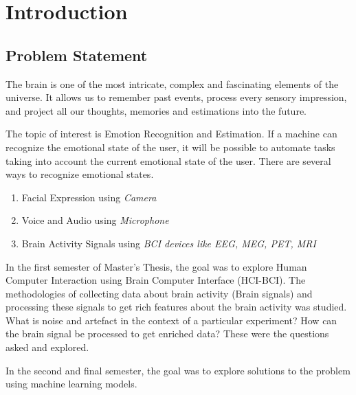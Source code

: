 
\chapter{Introduction} %

\label{Chapter 1} %



\section{Problem Statement}
The brain is one of the most intricate, complex and fascinating elements of the universe. It allows us to remember past events, process every sensory impression, and project all our thoughts, memories and estimations into the future.

The topic of interest is Emotion Recognition and Estimation. If a machine can recognize the emotional state of the user, it will be possible to automate tasks taking into account the current emotional state of the user. There are several ways to recognize emotional states.
\begin{enumerate}
\item Facial Expression using \emph{Camera}
\item Voice and Audio using \emph{Microphone}
\item Brain Activity Signals using \emph{BCI devices like EEG, MEG, PET, MRI}
\end{enumerate}

In the first semester of Master's Thesis, the goal was to explore Human Computer Interaction using Brain Computer Interface (HCI-BCI). The methodologies of collecting data about brain activity (Brain signals) and processing these signals to get rich features about the brain activity was studied. What is noise and artefact in the context of a particular experiment? How can the brain signal be processed to get enriched data? These were the questions asked and explored.

In the second and final semester, the goal was to explore solutions to the problem using machine learning models. 

